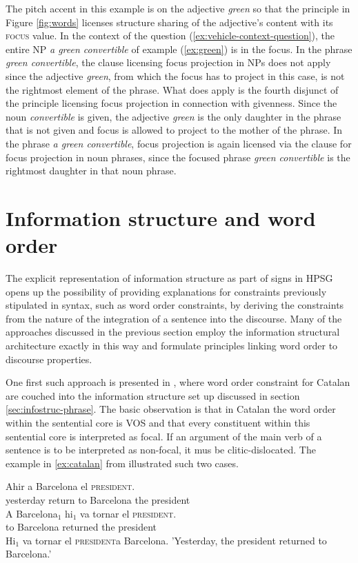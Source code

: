 \documentclass[output=paper]{langsci/langscibook}
\begin{document}
The pitch accent in this example is on the adjective \textit{green} so
that the principle in Figure \ref{fig:words} licenses structure
sharing of the adjective's content with its \textsc{focus} value. In
the context of the question (\ref{ex:vehicle-context-question}), the
entire NP \textit{a green convertible} of example (\ref{ex:green}) is
in the focus. In the phrase \textit{green convertible}, the clause
licensing focus projection in NPs does not apply since the adjective
\textit{green}, from which the focus has to project in this case, is
not the rightmost element of the phrase.  What does apply is the
fourth disjunct of the principle licensing focus projection in
connection with givenness. Since the noun \textit{convertible} is
given, the adjective \textit{green} is the only daughter in the phrase
that is not given and focus is allowed to project to the mother of the
phrase. In the phrase \textit{a green convertible}, focus projection is
again licensed via the clause for focus projection in noun phrases,
since the focused phrase \textit{green convertible} is the rightmost
daughter in that noun phrase.


\section{Information structure and word order}
\label{sec:word-order}
The explicit representation of information structure as part of signs
in HPSG opens up the possibility of providing explanations for
constraints previously stipulated in syntax, such as word order
constraints, by deriving the constraints from the nature of the
integration of a sentence into the discourse. Many of the approaches
discussed in the previous section employ the information structural
architecture exactly in this way and formulate principles linking word
order to discourse properties.

One first such approach is presented in \cite{EV96a}, where word order
constraint for Catalan are couched into the information structure set
up discussed in section \ref{sec:infostruc-phrase}. The basic
observation is that in Catalan the word order within the sentential
core is VOS and that every constituent within this sentential core is
interpreted as focal. If an argument of the main verb of a sentence is
to be interpreted as non-focal, it mus be clitic-dislocated. The
example in \ref{ex:catalan} from \cite{EV96a} illustrated such two
cases.

\begin{exe}
  \ex\label{ex:catalan}
  \begin{xlist}
    \ex\gll Ahir  a Barcelona el \textsc{president.} \RF\\
         yesterday return to Barcelona the president\\
   \ex\gll A Barcelona$_1$ \LF hi$_1$ {va tornar} el \textsc{president}.\RF\\
           to Barcelona  {} returned the president\\
   \ex \LF Hi$_1$ va tornar el \textsc{president}\RF a Barcelona.
\trans 'Yesterday, the president returned to Barcelona.'
  \end{xlist}
\end{exe}
 
\end{document}
